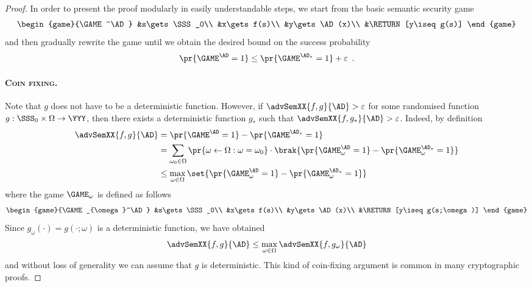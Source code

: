 \documentclass{llncs}
\begin{document}
\begin{proof}
In order to present the proof modularly in easily understandable
steps, we start from the basic semantic security game
\begin{align*}
  \begin{game}{\GAME^\AD}
    &s\gets\SSS_0\\
    &x\gets f(s)\\
    &y\gets\AD(x)\\
    &\RETURN [y\iseq g(s)]
  \end{game}
\end{align*}
and then gradually rewrite the game until we obtain the desired bound
on the success probability 
\begin{align*}
\pr{\GAME^\AD=1}\leq\pr{\smash{\GAME^{\AD_*}=1}}+\varepsilon\enspace.  
\end{align*}

\paragraph{\textsc{Coin fixing}.} Note that $g$ does not have to be a
deterministic function. However, if $\advSemXX{f,g}{\AD}>\varepsilon$
for some randomised function $g:\SSS_0\times\Omega\to\YYY$, then there
exists a deterministic function $g_*$ such that
$\advSemXX{f,g_*}{\AD}>\varepsilon$. Indeed,  by definition
\begin{align*}
  \advSemXX{f,g}{\AD}%
  &=\pr{\GAME^{\AD}=1}-\pr{\smash{\GAME^{\AD_*}=1}}\\
  &=\sum_{\omega_0\in\Omega}\pr{\omega\gets\Omega:\omega=\omega_0}
  \cdot\brak{\pr{\GAME_{\omega}^\AD=1}-\pr{\smash{\GAME_{\omega}^{\AD_*}=1}}}\\
  &\leq\max_{\omega\in\Omega}\set{\pr{\GAME_{\omega}^\AD=1}-\pr{\smash{\GAME_{\omega}^{\AD_*}=1}}}
\end{align*}
where the game $\GAME_{\omega}$ is defined as follows
\begin{align*}
  \begin{game}{\GAME_{\omega}^\AD}
    &s\gets\SSS_0\\
    &x\gets f(s)\\
    &y\gets\AD(x)\\
    &\RETURN [y\iseq g(s;\omega)]
  \end{game}
\end{align*}
Since $g_\omega(\cdot)=g(\cdot;\omega)$ is a deterministic function, we have obtained
\begin{align*}
  \advSemXX{f,g}{\AD}\leq\max_{\omega\in\Omega}\advSemXX{f,g_\omega}{\AD}
\end{align*}
and without loss of generality we can assume that $g$ is
deterministic.  This kind of coin-fixing argument is common in many
cryptographic proofs.


\end{proof}
\end{document}
